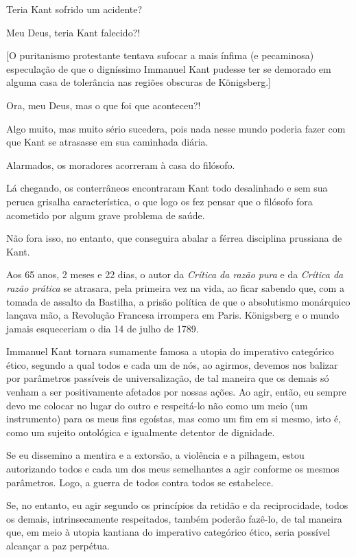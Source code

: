Teria Kant sofrido um acidente?

Meu Deus, teria Kant falecido?!

{[}O puritanismo protestante tentava sufocar a mais ínfima (e
pecaminosa) especulação de que o digníssimo Immanuel Kant pudesse ter se
demorado em alguma casa de tolerância nas regiões obscuras de
Königsberg.{]}

Ora, meu Deus, mas o que foi que aconteceu?!

Algo muito, mas muito sério sucedera, pois nada nesse mundo poderia
fazer com que Kant se atrasasse em sua caminhada diária.

Alarmados, os moradores acorreram à casa do filósofo.

Lá chegando, os conterrâneos encontraram Kant todo desalinhado e sem sua
peruca grisalha característica, o que logo os fez pensar que o filósofo
fora acometido por algum grave problema de saúde.

Não fora isso, no entanto, que conseguira abalar a férrea disciplina
prussiana de Kant.

Aos 65 anos, 2 meses e 22 dias, o autor da \emph{Crítica da razão pura}
e da \emph{Crítica da razão prática} se atrasara, pela primeira vez na
vida, ao ficar sabendo que, com a tomada de assalto da Bastilha, a
prisão política de que o absolutismo monárquico lançava mão, a Revolução
Francesa irrompera em Paris. Königsberg e o mundo jamais esqueceriam o
dia 14 de julho de 1789.

Immanuel Kant tornara sumamente famosa a utopia do imperativo categórico
ético, segundo a qual todos e cada um de nós, ao agirmos, devemos nos
balizar por parâmetros passíveis de universalização, de tal maneira que
os demais só venham a ser positivamente afetados por nossas ações. Ao
agir, então, eu sempre devo me colocar no lugar do outro e respeitá-lo
não como um meio (um instrumento) para os meus fins egoístas, mas como
um fim em si mesmo, isto é, como um sujeito ontológica e igualmente
detentor de dignidade.

Se eu dissemino a mentira e a extorsão, a violência e a pilhagem, estou
autorizando todos e cada um dos meus semelhantes a agir conforme os
mesmos parâmetros. Logo, a guerra de todos contra todos se estabelece.

Se, no entanto, eu agir segundo os princípios da retidão e da
reciprocidade, todos os demais, intrinsecamente respeitados, também
poderão fazê-lo, de tal maneira que, em meio à utopia kantiana do
imperativo categórico ético, seria possível alcançar a paz perpétua.

